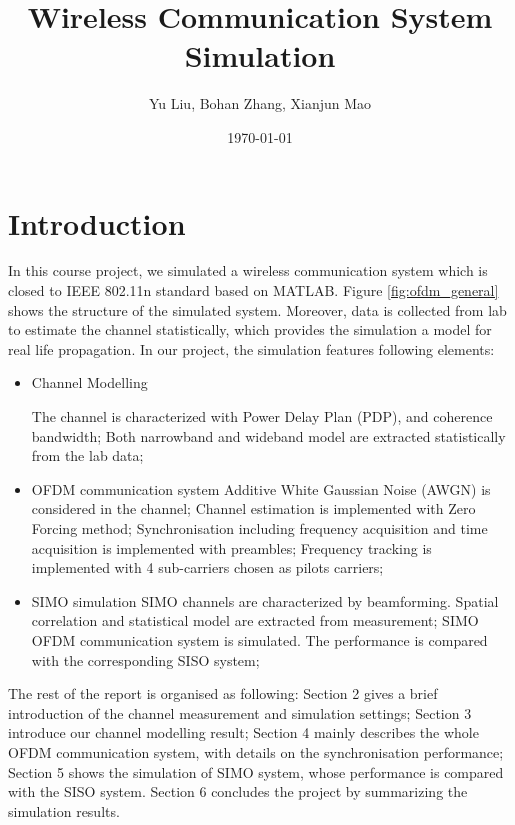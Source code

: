 \documentclass[a4paper]{article}
\begin{document}
	
	\title{Wireless Communication System Simulation}
	\author{Yu Liu, Bohan Zhang, Xianjun Mao}
	\date{\today}
	\maketitle
	
	\section{Introduction}
	
	In this course project, we simulated a wireless communication system which is closed to IEEE 802.11n standard based on MATLAB. Figure \ref{fig:ofdm_general} shows the structure of the simulated system. Moreover, data is collected from lab to estimate the channel statistically, which provides the simulation a model for real life propagation. In our project, the simulation features following elements:
	
	\begin{itemize}
		\item Channel Modelling 
		
		\subitem The channel is characterized with Power Delay Plan (PDP), and coherence bandwidth;
		\subitem Both narrowband and wideband model are extracted statistically from the lab data;
		
		\item OFDM communication system
		\subitem Additive White Gaussian Noise (AWGN) is considered in the channel;
		\subitem Channel estimation is implemented with Zero Forcing method;
		\subitem Synchronisation including frequency acquisition and time acquisition is implemented with preambles;
		\subitem Frequency tracking is implemented with 4 sub-carriers chosen as pilots carriers;
		
		\item SIMO simulation
		\subitem SIMO channels are characterized by beamforming. Spatial correlation and statistical model are extracted from measurement;
		\subitem SIMO OFDM communication system is simulated. The performance is compared with the corresponding SISO system;
	\end{itemize}
	
	The rest of the report is organised as following: Section 2 gives a brief introduction of the channel measurement and simulation settings; Section 3 introduce our channel modelling result; Section 4 mainly describes the whole OFDM communication system, with details on the synchronisation performance; Section 5 shows the simulation of SIMO system, whose performance is compared with the SISO system. Section 6 concludes the project by summarizing the simulation results. 
	
\end{document}

